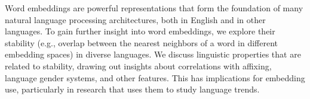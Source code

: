 Word embeddings are powerful representations that form the foundation of many natural language processing architectures, both in English and in other languages. To gain further insight into word embeddings, we explore their stability (e.g., overlap between the nearest neighbors of a word in different embedding spaces) in diverse languages. We discuss linguistic properties that are related to stability, drawing out insights about correlations with affixing, language gender systems, and other features. This has implications for embedding use, particularly in research that uses them to study language trends.

